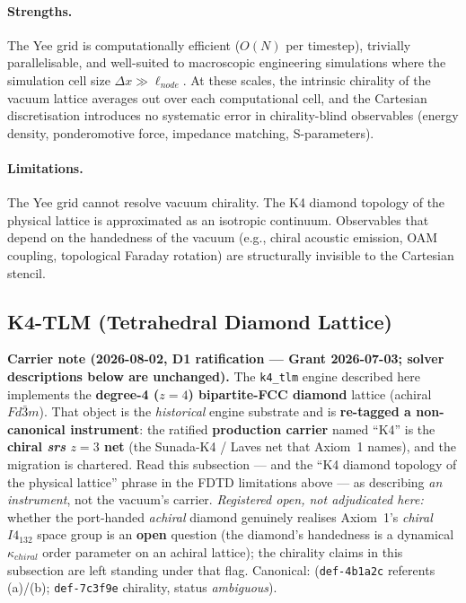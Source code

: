 \paragraph{Strengths.} The Yee grid is computationally efficient ($O(N)$ per timestep), trivially parallelisable, and well-suited to macroscopic engineering simulations where the simulation cell size $\Delta x \gg \ell_{node}$. At these scales, the intrinsic chirality of the vacuum lattice averages out over each computational cell, and the Cartesian discretisation introduces no systematic error in chirality-blind observables (energy density, ponderomotive force, impedance matching, S-parameters).

\paragraph{Limitations.} The Yee grid cannot resolve vacuum chirality. The K4 diamond topology of the physical lattice is approximated as an isotropic continuum. Observables that depend on the handedness of the vacuum (e.g., chiral acoustic emission, OAM coupling, topological Faraday rotation) are structurally invisible to the Cartesian stencil.

\subsection{K4-TLM (Tetrahedral Diamond Lattice)}

\noindent\textbf{Carrier note (2026-08-02, D1 ratification --- Grant 2026-07-03; solver descriptions below are unchanged).} The \texttt{k4\_tlm} engine described here implements the \textbf{degree-4 ($z = 4$) bipartite-FCC diamond} lattice (achiral $Fd\bar{3}m$). That object is the \emph{historical} engine substrate and is \textbf{re-tagged a non-canonical instrument}: the ratified \textbf{production carrier} named ``K4'' is the \textbf{chiral \emph{srs} $z = 3$ net} (the Sunada-K4 / Laves net that Axiom~1 names), and the migration is chartered. Read this subsection --- and the ``K4 diamond topology of the physical lattice'' phrase in the FDTD limitations above --- as describing \emph{an instrument}, not the vacuum's carrier. \emph{Registered open, not adjudicated here:} whether the port-handed \emph{achiral} diamond genuinely realises Axiom~1's \emph{chiral} $I4_132$ space group is an \textbf{open} question (the diamond's handedness is a dynamical $\kappa_{chiral}$ order parameter on an achiral lattice); the chirality claims in this subsection are left standing under that flag. Canonical:  (\texttt{def-4b1a2c} referents (a)/(b); \texttt{def-7c3f9e} chirality, status \emph{ambiguous}).

